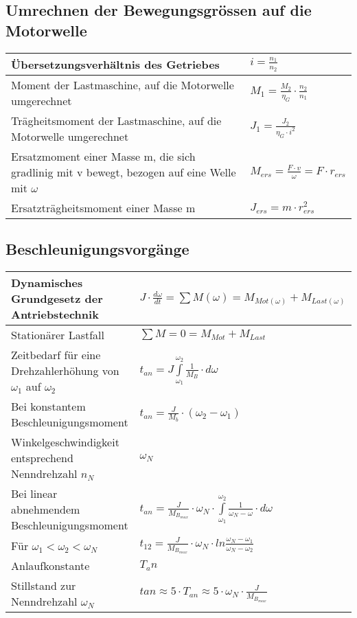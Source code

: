 \subsection{Umrechnen der Bewegungsgrössen auf die Motorwelle}
\begin{tabular}[c]{ | p{14.5cm} | p{3cm} | }
	\hline
	Übersetzungsverhältnis des Getriebes & $i=\frac{n_1}{n_2}$\\
	\hline
	Moment der Lastmaschine, auf die Motorwelle umgerechnet &
	$M_1=\frac{M_2}{\eta_G}\cdot\frac{n_2}{n_1}$\\
	\hline
	Trägheitsmoment der Lastmaschine, auf die Motorwelle umgerechnet &
	$J_1=\frac{J_2}{\eta_G\cdot i^2}$\\
	\hline
	Ersatzmoment einer Masse m, die sich gradlinig mit v bewegt, bezogen auf eine
	Welle mit $\omega$ & $M_{ers}=\frac{F\cdot v}{\omega}=F\cdot r_{ers}$\\
	\hline
	Ersatzträgheitsmoment einer Masse m & $J_{ers}=m\cdot r_{ers}^2$ \\
	\hline
\end{tabular}

\subsection{Beschleunigungsvorgänge}
\begin{tabular}[c]{ | p{9cm} | p{8.5cm} | }
	\hline
	Dynamisches Grundgesetz der Antriebstechnik & $J\cdot\frac{d\omega}{dt}= \sum
	M(\omega)=M_{Mot(\omega)}+M_{Last(\omega)}$\\
	\hline
	Stationärer Lastfall & $\sum M=0=M_{Mot}+M_{Last}$\\
	\hline
	Zeitbedarf für eine Drehzahlerhöhung von $\omega_1$ auf $\omega_2$ &
	$t_{an}=J\int\limits_{\omega_1}^{\omega_2}\frac{1}{M_B}\cdot d\omega$ \\
	\hline
	Bei konstantem Beschleunigungsmoment &
	$t_{an}=\frac{J}{M_b}\cdot\left(\omega_2-\omega_1\right)$ \\
	\hline
	Winkelgeschwindigkeit entsprechend Nenndrehzahl $n_N$ & $\omega_N$\\
	\hline
	Bei linear abnehmendem Beschleunigungsmoment &
	$t_{an}=\frac{J}{M_{B_{max}}}\cdot\omega_N\cdot\int\limits_{\omega_1}^{\omega_2}\frac{1}{\omega_N-\omega}\cdot
	d\omega$ \\
	\hline
	Für $\omega_1 < \omega_2 < \omega_N$ &
	$t_{12}=\frac{J}{M_{B_{max}}}\cdot\omega_N\cdot
	ln\frac{\omega_N-\omega_1}{\omega_N-\omega_2}$ \\
	\hline
	Anlaufkonstante & $T_an$\\
	\hline
	Stillstand zur Nenndrehzahl $\omega_N$ & $t{an}\approx 5\cdot T_{an}\approx
	5\cdot\omega_N\cdot\frac{J}{M_{B_{max}}}$\\
	\hline
\end{tabular}


